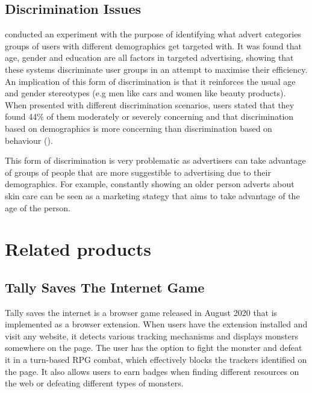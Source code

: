 \documentclass{l4proj}
\begin{document}
\subsection{Discrimination Issues}
\cite{Bol2019a} conducted an experiment with the purpose of identifying what advert categories groups of users with different demographics get targeted with. It was found that age, gender and education are all factors in targeted advertising, showing that these systems discriminate user groups in an attempt to maximise their efficiency. An implication of this form of discrimination is that it reinforces the usual age and gender stereotypes (e.g men like cars and women like beauty products). When presented with different discrimination scenarios, users stated that they found 44\% of them moderately or severely concerning and that discrimination based on demographics is more concerning than discrimination based on behaviour (\cite{Plane2017}).

This form of discrimination is very problematic as advertisers can take advantage of groups of people that are more suggestible to advertising due to their demographics. For example, constantly showing an older person adverts about skin care can be seen as a marketing stategy that aims to take advantage of the age of the person.


\section{Related products}
\subsection{Tally Saves The Internet Game}
Tally saves the internet is a browser game released in August 2020 that is implemented as a browser extension. When users have the extension installed and visit any website, it detects various tracking mechanisms and displays monsters somewhere on the page. The user has the option to fight the monster and defeat it in a turn-based RPG combat, which effectively blocks the trackers identified on the page. It also allows users to earn badges when finding different resources on the web or defeating different types of monsters.
\end{document}
